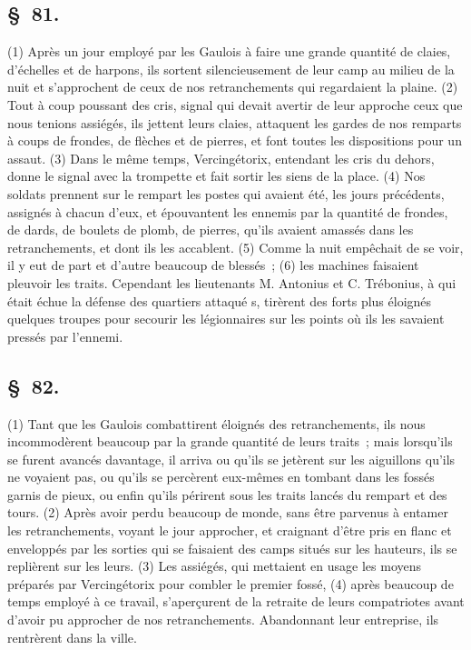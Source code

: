 \documentclass[french,twoside]{book} %
\begin{document}
\subsection[{§ 81.}]{ \textsc{§ 81.} }
\noindent (1) Après un jour employé par les Gaulois à faire une grande quantité de claies, d’échelles et de harpons, ils sortent silencieusement de leur camp au milieu de la nuit et s’approchent de ceux de nos retranchements qui regardaient la plaine. (2) Tout à coup poussant des cris, signal qui devait avertir de leur approche ceux que nous tenions assiégés, ils jettent leurs claies, attaquent les gardes de nos remparts à coups de frondes, de flèches et de pierres, et font toutes les dispositions pour un assaut. (3) Dans le même temps, Vercingétorix, entendant les cris du dehors, donne le signal avec la trompette et fait sortir les siens de la place. (4) Nos soldats prennent sur le rempart les postes qui avaient été, les jours précédents, assignés à chacun d’eux, et épouvantent les ennemis par la quantité de frondes, de dards, de boulets de plomb, de pierres, qu’ils avaient amassés dans les retranchements, et dont ils les accablent. (5) Comme la nuit empêchait de se voir, il y eut de part et d’autre beaucoup de blessés ; (6) les machines faisaient pleuvoir les traits. Cependant les lieutenants M. Antonius et C. Trébonius, à qui était échue la défense des quartiers attaqué s, tirèrent des forts plus éloignés quelques troupes pour secourir les légionnaires sur les points où ils les savaient pressés par l’ennemi.
\subsection[{§ 82.}]{ \textsc{§ 82.} }
\noindent (1) Tant que les Gaulois combattirent éloignés des retranchements, ils nous incommodèrent beaucoup par la grande quantité de leurs traits ; mais lorsqu’ils se furent avancés davantage, il arriva ou qu’ils se jetèrent sur les aiguillons qu’ils ne voyaient pas, ou qu’ils se percèrent eux-mêmes en tombant dans les fossés garnis de pieux, ou enfin qu’ils périrent sous les traits lancés du rempart et des tours. (2) Après avoir perdu beaucoup de monde, sans être parvenus à entamer les retranchements, voyant le jour approcher, et craignant d’être pris en flanc et enveloppés par les sorties qui se faisaient des camps situés sur les hauteurs, ils se replièrent sur les leurs. (3) Les assiégés, qui mettaient en usage les moyens préparés par Vercingétorix pour combler le premier fossé, (4) après beaucoup de temps employé à ce travail, s’aperçurent de la retraite de leurs compatriotes avant d’avoir pu approcher de nos retranchements. Abandonnant leur entreprise, ils rentrèrent dans la ville.
\end{document}
